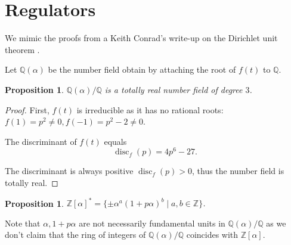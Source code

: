 \documentclass[a4paper]{article}
\newtheorem{Prop}[Thm]{Proposition}
\newcommand{\Q}{\mathbb{Q}}        %
\DeclareMathOperator{\disc}{disc}        %
\begin{document}
\section{Regulators}
We mimic the proofs from a Keith Conrad's write-up on the Dirichlet unit theorem \cite{conraddirichlet}.


Let $\Q(\alpha)$ be the number field obtain by attaching the root of $f(t)$ to $\Q$.
\begin{Prop}
$\Q(\alpha) / \Q$ is a totally real number field of degree $3$.
\end{Prop}

\begin{proof}
First, $f(t)$ is irreducible as it has no rational roots: $f(1) = p^2 \ne 0, f(-1) = p^2 - 2 \ne 0 $.

The discriminant of $f(t)$ equals
$$\disc_f(p) = 4 p^6 - 27 .$$

The discriminant is always positive $\disc_f(p) > 0$, thus the number field is totally real.
\end{proof}


\begin{Prop}
\label{prop_multiplicative_group_structure}
$\mathbb{Z}[\alpha]^{*} = \{ \pm \alpha^a (1 + p \alpha)^b \mid a, b \in \mathbb{Z} \} $.
\end{Prop}

Note that $\alpha, 1 + p \alpha$ are not necessarily fundamental units in $\Q(\alpha)/\Q$ as we don't claim that the ring of integers of $\Q(\alpha) / \Q$ coincides with $\mathbb{Z}[\alpha]$.
\end{document}
